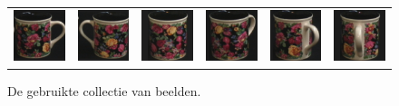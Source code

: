 \begin{figure}[p]
\begin{tabular}{cccccc}
\includegraphics[width=2cm]{coil/beeld-60.eps} &
\includegraphics[width=2cm]{coil/beeld-61.eps} &
\includegraphics[width=2cm]{coil/beeld-62.eps} &
\includegraphics[width=2cm]{coil/beeld-63.eps} &
\includegraphics[width=2cm]{coil/beeld-64.eps} &
\includegraphics[width=2cm]{coil/beeld-65.eps} \\

\end{tabular}
\vspace{5pt}
\caption{\label{fig:testcollectie}De gebruikte collectie van beelden.}
\end{figure}

